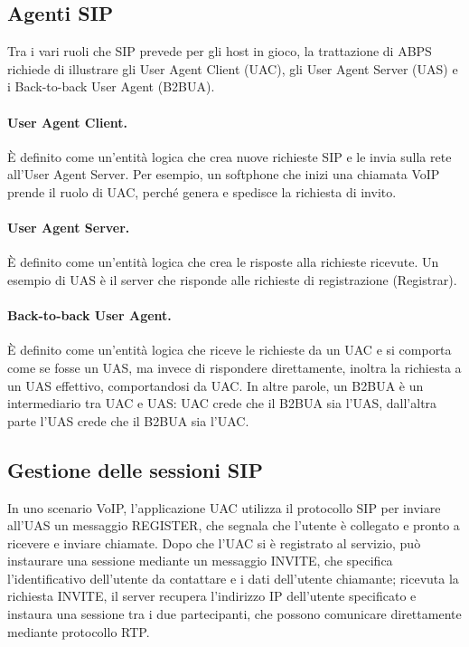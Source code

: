 \documentclass[12pt,a4paper,openright,twoside]{book}
\begin{document}
\subsection{Agenti SIP}

Tra i vari ruoli che SIP prevede per gli host in gioco, la trattazione
di ABPS richiede di illustrare gli User Agent Client (UAC), gli User
Agent Server (UAS) e i Back-to-back User Agent (B2BUA).

\paragraph{User Agent Client.}
È definito come un'entità logica che crea nuove richieste SIP e le
invia sulla rete all'User Agent Server. Per esempio, un softphone che
inizi una chiamata VoIP prende il ruolo di UAC, perché genera e
spedisce la richiesta di invito.

\paragraph{User Agent Server.}
È definito come un'entità logica che crea le risposte alla richieste
ricevute. Un esempio di UAS è il server che risponde alle richieste di
registrazione (Registrar).

\paragraph{Back-to-back User Agent.}

È definito come un'entità logica che riceve le richieste da un UAC e
si comporta come se fosse un UAS, ma invece di rispondere
direttamente, inoltra la richiesta a un UAS effettivo, comportandosi
da UAC. In altre parole, un B2BUA è un intermediario tra UAC e UAS:
UAC crede che il B2BUA sia l'UAS, dall'altra parte l'UAS crede che il
B2BUA sia l'UAC.

\subsection{Gestione delle sessioni SIP}

In uno scenario VoIP, l'applicazione UAC utilizza il protocollo SIP
per inviare all'UAS un messaggio REGISTER, che segnala che l'utente è
collegato e pronto a ricevere e inviare chiamate. Dopo che l'UAC si è
registrato al servizio, può instaurare una sessione mediante un
messaggio INVITE, che specifica l'identificativo dell'utente da
contattare e i dati dell'utente chiamante; ricevuta la richiesta
INVITE, il server recupera l'indirizzo IP dell'utente specificato e
instaura una sessione tra i due partecipanti, che possono comunicare
direttamente mediante protocollo RTP.
\end{document}

